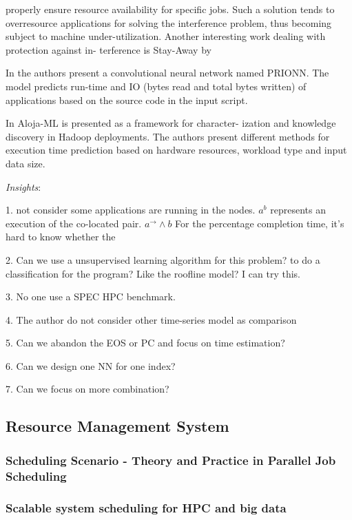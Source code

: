 \documentclass[UTF8]{article}
\begin{document}
properly ensure resource availability for specific jobs. Such a solution tends to overresource applications for solving the interference problem, thus becoming subject to machine under-utilization. Another interesting work dealing with protection against in- terference is Stay-Away by \cite{rameshan2014stay}

In \cite{wyatt2018prionn} the authors present a convolutional neural network named PRIONN. The model predicts run-time and IO (bytes read and total bytes written) of applications based on the source code in the input script. 

In \cite{berral2015aloja} Aloja-ML is presented as a framework for character- ization and knowledge discovery in Hadoop deployments. The authors present different methods for execution time prediction based on hardware resources, workload type and input data size.

\emph{Insights}: 

1. not consider some applications are running in the nodes. $a^b$ represents an execution of the co-located pair. $a^{\rightarrow} \wedge b$ For the percentage completion time, it's hard to know whether the 

2. Can we use a unsupervised learning algorithm for this problem?  to do a classification for the program?  Like the roofline model? I can try this.

3. No one use a SPEC HPC benchmark.

4. The author do not consider other time-series model as comparison

5. Can we abandon the EOS or PC and focus on time estimation?

6. Can we design one NN for one index?

7. Can we focus on more combination?

\subsection{Resource Management System}
\subsubsection{Scheduling Scenario - Theory and Practice in Parallel Job Scheduling}

\subsubsection{Scalable system scheduling for HPC and big data}
\end{document}
